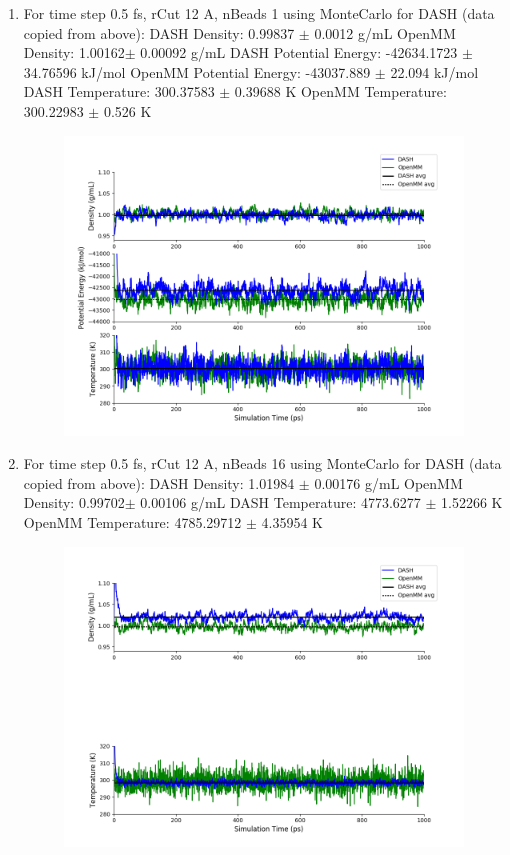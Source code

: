 \documentclass[12pt,reqno]{amsart}
\numberwithin{equation}{section}
\begin{document}
\begin{enumerate}
\item For time step 0.5 fs, rCut 12 A, nBeads 1 using MonteCarlo for DASH (data copied from above):
\subitem DASH Density: 0.99837 $\pm$ 0.0012 g/mL
\subitem OpenMM Density: 1.00162$\pm$ 0.00092 g/mL
\subitem DASH Potential Energy: -42634.1723 $\pm$ 34.76596 kJ/mol
\subitem OpenMM Potential Energy: -43037.889 $\pm$ 22.094 kJ/mol
\subitem DASH Temperature: 300.37583 $\pm$ 0.39688  K
\subitem OpenMM Temperature:  300.22983 $\pm$ 0.526 K
\begin{figure}[H]
\centering
\includegraphics[scale=0.7]{MC-MM-nBead1-rCut12-ts05-update}
\end{figure}

\item For time step 0.5 fs, rCut 12 A, nBeads 16 using MonteCarlo for DASH (data copied from above):
\subitem DASH Density: 1.01984 $\pm$ 0.00176 g/mL
\subitem OpenMM Density: 0.99702$\pm$ 0.00106 g/mL
\subitem DASH Temperature: 4773.6277 $\pm$ 1.52266  K
\subitem OpenMM Temperature:  4785.29712 $\pm$ 4.35954 K
\begin{figure}[H]
\centering
\includegraphics[scale=0.7]{MC-MM-nBead16-rCut12-ts05-update}
\end{figure}


\end{enumerate}
\end{document}
